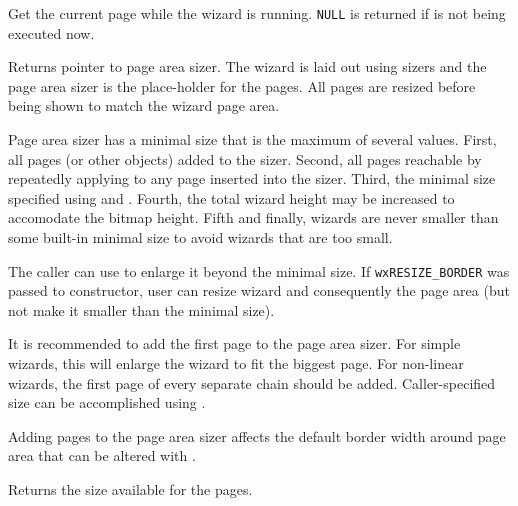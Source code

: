 \label{wxwizardgetcurrentpage}


Get the current page while the wizard is running. {\tt NULL} is returned if 
 is not being executed now.


\label{wxwizardgetpageareasizer}


Returns pointer to page area sizer. The wizard is laid out using sizers and
the page area sizer is the place-holder for the pages. All pages are resized before
being shown to match the wizard page area.

Page area sizer has a minimal size that is the maximum of several values. First,
all pages (or other objects) added to the sizer. Second, all pages reachable
by repeatedly applying 
 to
any page inserted into the sizer. Third,
the minimal size specified using  and 
. Fourth, the total wizard height may
be increased to accomodate the bitmap height. Fifth and finally, wizards are
never smaller than some built-in minimal size to avoid wizards that are too small.

The caller can use  to enlarge it
beyond the minimal size. If {\tt wxRESIZE\_BORDER} was passed to constructor, user
can resize wizard and consequently the page area (but not make it smaller than the
minimal size).

It is recommended to add the first page to the page area sizer. For simple wizards,
this will enlarge the wizard to fit the biggest page. For non-linear wizards,
the first page of every separate chain should be added. Caller-specified size
can be accomplished using .

Adding pages to the page area sizer affects the default border width around page
area that can be altered with .


\label{wxwizardgetpagesize}


Returns the size available for the pages.


